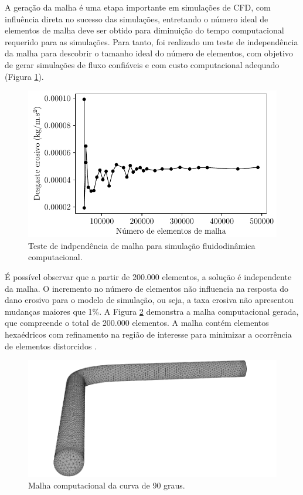 A geração da malha é uma etapa importante em simulações de CFD, com influência
direta no sucesso das simulações, entretando o número ideal de elementos de malha deve ser obtido para diminuição do tempo computacional requerido para as simulações. Para tanto, foi realizado um teste de independência da malha  para descobrir o tamanho ideal do número de elementos, com objetivo de gerar simulações de fluxo confiáveis e com custo computacional adequado (Figura \ref{fig:refmalha}).

\begin{figure}[H] 
    \centering  
    \includegraphics[textwidth=0.85\textwidth]{Figuras/testedemalha.pdf}  
    \caption{Teste de indpendência de malha para simulação fluidodinâmica computacional.}  
    \label{fig:refmalha}  
\end{figure}

É possível observar que a partir de 200.000 elementos, a solução é independente da malha. O incremento no número de elementos não influencia na resposta do dano erosivo para o modelo de simulação, ou seja, a taxa erosiva não apresentou mudanças maiores que 1\%. A Figura \ref{fig:malhaerosao} demonstra a malha computacional gerada, que compreende o total de 200.000 elementos. A malha contém elementos hexaédricos com refinamento na região de interesse para minimizar a ocorrência de elementos distorcidos \cite{zhang}.

\begin{figure}[H] 
    \centering  
    \includegraphics[textwidth=0.33\textwidth]{Figuras/MALHA.pdf}  
    \caption{Malha computacional da curva de 90 graus.}  
    \label{fig:malhaerosao}  
\end{figure}

